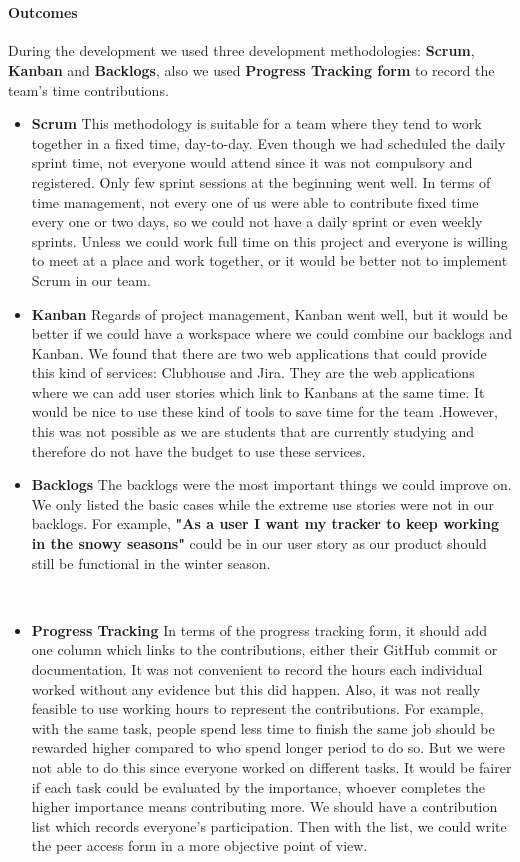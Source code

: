 \documentclass[12pt,a4paper]{article}
\begin{document}
        \paragraph{Outcomes}During the development we used three development methodologies: {\bf Scrum}, {\bf Kanban} and {\bf Backlogs}, also we used {\bf Progress Tracking form} to record the team's time contributions.

        \begin{itemize}
          \item {\bf Scrum} This methodology is suitable for a team where they tend to work together in a fixed time, day-to-day. Even though we had scheduled the daily sprint time, not everyone would attend since it was not compulsory and registered. Only few sprint sessions at the beginning went well. In terms of time management, not every one of us were able to contribute fixed time every one or two days, so we could not have a daily sprint or even weekly sprints. Unless we could work full time on this project and everyone is willing to meet at a place and work together, or it would be better not to implement Scrum in our team. 
          
          \item {\bf Kanban} Regards of project management, Kanban went well, but it would be better if we could have a workspace where we could combine our backlogs and Kanban. We found that there are two web applications that could provide this kind of services: Clubhouse and Jira. They are the web applications where we can add user stories which link to Kanbans at the same time. It would be nice to use these kind of tools to save time for the team .However, this was not possible as we are students that are currently studying and therefore do not have the budget to use these services.
        
          \item {\bf Backlogs} The backlogs were the most important things we could improve on. We only listed the basic cases while the extreme use stories were not in our backlogs. For example, {\bf "As a user I want my tracker to keep working in the snowy seasons"} could be in our user story as our product should still be functional in the winter season.

          \item {\bf Progress Tracking} In terms of the progress tracking form, it should add one column which links to the contributions, either their GitHub commit or documentation. It was not convenient to record the hours each individual worked without any evidence but this did happen. Also, it was not really feasible to use working hours to represent the contributions. For example, with the same task, people spend less time to finish the same job should be rewarded higher compared to who spend longer period to do so. But we were not able to do this since everyone worked on different tasks. It would be fairer if each task could be evaluated by the importance, whoever completes the higher importance means contributing more. We should have a contribution list which records everyone's participation. Then with the list, we could write the peer access form in a more objective point of view.
        \end{itemize}
\end{document}
